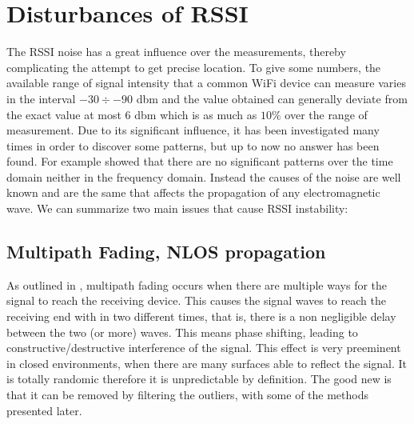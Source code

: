 \documentclass[12pt,twoside]{report}
\begin{document}
\chapter{Disturbances of RSSI}
The RSSI noise has a great influence over the measurements, thereby complicating the attempt to get precise location. To give some numbers, the available range of signal intensity that a common WiFi device can measure varies in the interval $-30\div-90$ dbm and the value obtained can generally deviate from the exact value at most $6$ dbm which is as much as $10\%$ over the range of measurement.
Due to its significant influence, it has been investigated many times in order to discover some patterns, but up to now no answer has been found. For example \cite{4608603} showed that there are no significant patterns over the time domain neither in the frequency domain. Instead the causes of the noise are well known and are the same that affects the propagation of any electromagnetic wave.
We can summarize two main issues that cause RSSI instability: 
\section{Multipath Fading, NLOS propagation} 
As outlined in \cite{onl11}, multipath fading occurs when there are multiple ways for the signal to reach the receiving device. This causes the signal waves to reach the receiving end with in two different times, that is, there is a non negligible delay between the two (or more) waves. This means phase shifting, leading to constructive/destructive interference of the signal. This effect is very preeminent in closed environments, when there are many surfaces able to reflect the signal. It is totally randomic \cite{10.5555/559977} therefore it is unpredictable by definition. The good new is that it can be removed by filtering the outliers, with some of the methods presented later.
\end{document}
